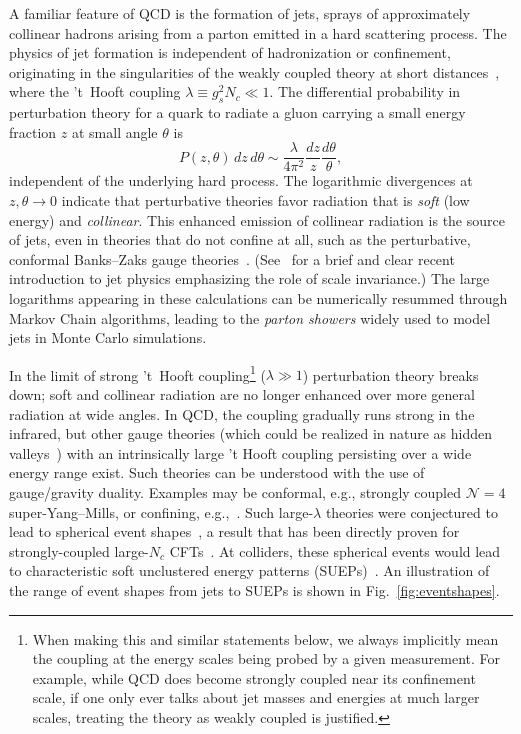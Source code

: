 A familiar feature of QCD is the formation of jets, sprays of approximately collinear hadrons arising from a parton emitted in a hard scattering process. The physics of jet formation is independent of hadronization or confinement, originating in the singularities of the weakly coupled theory at short distances~\cite{Sterman:1977wj}, where the 't~Hooft coupling $\lambda \equiv g_s^2 N_c \ll 1$. The differential probability in perturbation theory for a quark to radiate a gluon carrying a small energy fraction $z$ at small angle $\theta$ is
\begin{equation}
\label{eq:scsplit}
  P(z, \theta)\, dz\, d\theta \sim \frac{\lambda}{4\pi^2} \frac{dz}{z} \frac{d\theta}{\theta},
\end{equation}
independent of the underlying hard process. The logarithmic divergences at $z, \theta \to 0$ indicate that perturbative theories favor radiation that is \emph{soft} (low energy) and \emph{collinear}. This enhanced emission of collinear radiation is the source of jets, even in theories that do not confine at all, such as the perturbative, conformal Banks--Zaks gauge theories~\cite{Banks:1981nn}. (See~\cite{Larkoski:2017fip} for a brief and clear recent introduction to jet physics emphasizing the role of scale invariance.) The large logarithms appearing in these calculations can be numerically resummed through Markov Chain algorithms, leading to the \emph{parton showers} widely used to model jets in Monte Carlo simulations. 

In the limit of strong 't~Hooft coupling\footnote{When making this and similar statements below, we always implicitly mean the coupling at the energy scales being probed by a given measurement. For example, while QCD does become strongly coupled near its confinement scale, if one only ever talks about jet masses and energies at much larger scales, treating the theory as weakly coupled is justified.} ($\lambda \gg 1$) perturbation theory breaks down; soft and collinear radiation are no longer enhanced over more general radiation at wide angles. In QCD, the coupling gradually runs strong in the infrared, but other gauge theories (which could  be realized in nature as hidden valleys~\cite{Strassler:2006im}) with an intrinsically large 't Hooft coupling persisting over a wide energy range exist. Such theories can be understood with the use of gauge/gravity duality. Examples may be conformal, e.g., strongly coupled $\mathcal{N} = 4$ super-Yang--Mills, or confining, e.g.,~\cite{Polchinski:2000uf, Klebanov:2000hb}. Such large-$\lambda$ theories were conjectured to lead to spherical event shapes~\cite{Strassler:2008bv}, a result that has been directly proven for strongly-coupled large-$N_c$ CFTs~\cite{Hofman:2008ar}. At colliders, these spherical events would lead to characteristic soft unclustered energy patterns (SUEPs)~\cite{Kang:2008ea, Harnik:2008ax, Knapen:2016hky}. An illustration of the range of event shapes from jets to SUEPs is shown in Fig.~\ref{fig:eventshapes}.

